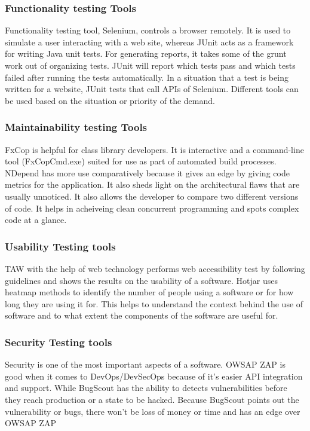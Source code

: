\documentclass[journal, onecolumn]{IEEEtran}
\begin{document}
	\subsubsection{Functionality testing Tools}
	Functionality testing tool, Selenium, controls a browser remotely. It is used to simulate a user interacting with a web site, whereas JUnit acts as a framework for writing Java unit tests. For generating reports, it takes some of the grunt work out of organizing tests. JUnit will report which tests pass and which tests failed after running the tests automatically. In a situation that a test is being written for a website, JUnit tests that call APIs of Selenium. Different tools can be used based on the situation or priority of the demand.
	\bigskip
	
	\subsubsection{Maintainability testing Tools}
	FxCop is helpful for class library developers. It is interactive and a command-line tool (FxCopCmd.exe) suited for use as part of automated build processes. NDepend has more use comparatively because it gives an edge by giving code metrics for the application. It also sheds light on the architectural flaws that are usually unnoticed. It also allows the developer to compare two different versions of code. It helps in acheiveing clean concurrent programming and spots complex code at a glance.
	\bigskip
	
	\subsubsection{Usability Testing tools}
	TAW with the help of web technology performs web accessibility test by following guidelines and shows the results on the usability of a software. Hotjar uses heatmap methods to identify the number of people using a software or for how long they are using it for. This helps to understand the context behind the use of software and to what extent the components of the software are useful for.
	\bigskip
	
	\subsubsection{Security Testing tools}
	Security is one of the most important aspects of a software. OWSAP ZAP is good when it comes to DevOps/DevSecOps because of it's easier API integration and support. While BugScout has the ability to detects vulnerabilities before they reach production or a state to be hacked. Because BugScout points out the vulnerability or bugs, there won't be loss of money or time and has an edge over OWSAP ZAP
	\bigskip
	
\end{document}
